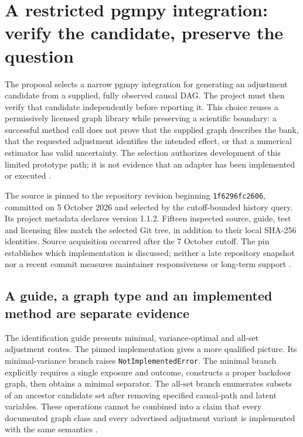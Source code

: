 \section{A restricted pgmpy integration: verify the candidate, preserve the question}
\label{exec13:pgmpy-reuse}

The proposal selects a narrow pgmpy integration for generating an adjustment
candidate from a supplied, fully observed causal DAG. The project must then
verify that candidate independently before reporting it. This choice reuses
a permissively licensed graph library while preserving a scientific boundary:
a successful method call does not prove that the supplied graph describes
the bank, that the requested adjustment identifies the intended effect, or
that a numerical estimator has valid uncertainty. The selection authorizes
development of this limited prototype path; it is not evidence that an
adapter has been implemented or executed
\cite{exec13_pgmpy_reuse_primary,exec13_pgmpy_reuse_oracle}.

The source is pinned to the repository revision beginning
\texttt{1f6296fc2606}, committed on 5 October 2026 and selected by the
cutoff-bounded history query. Its project metadata declares version 1.1.2.
Fifteen inspected source, guide, test and licensing files match the selected
Git tree, in addition to their local SHA-256 identities. Source acquisition
occurred after the 7 October cutoff. The pin establishes which implementation
is discussed; neither a late repository snapshot nor a recent commit measures
maintainer responsiveness or long-term support
\cite{exec13_pgmpy_reuse_primary}.

\subsection{A guide, a graph type and an implemented method are separate evidence}

The identification guide presents minimal, variance-optimal and all-set
adjustment routes. The pinned implementation gives a more qualified picture.
Its minimal-variance branch raises \texttt{NotImplementedError}. The minimal
branch explicitly requires a single exposure and outcome, constructs a
proper backdoor graph, then obtains a minimal separator. The all-set branch
enumerates subsets of an ancestor candidate set after removing specified
causal-path and latent variables. These operations cannot be combined into
a claim that every documented graph class and every advertised adjustment
variant is implemented with the same semantics
\cite{exec13_pgmpy_reuse_primary}.

